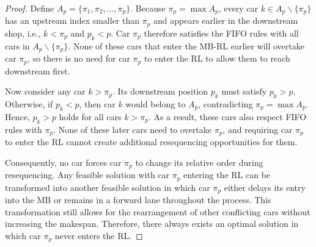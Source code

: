 \documentclass[10pt,a4paper]{amsart}
\begin{document}
\begin{proof}
    Define $A_p=\{\pi_1,\pi_2,\dots,\pi_p\}$. Because $\pi_p=\max A_p$, every car $k\in A_p\backslash\{\pi_p\}$ has an upstream index smaller than $\pi_p$ and appears earlier in the downstream shop, i.e., $k<\pi_p$ and $p_k<p$. Car $\pi_p$ therefore satisfies the FIFO rules with all cars in $A_p\backslash \{\pi_p\}$. None of these cars that enter the MB-RL earlier will overtake car $\pi_p$, so there is no need for car $\pi_p$ to enter the RL to allow them to reach downstream first.

    Now consider any car $k>\pi_p$. Its downstream position $p_k$ must satisfy $p_k>p$. Otherwise, if $p_k<p$, then car $k$ would belong to $A_p$, contradicting $\pi_p=\max A_p$. Hence, $p_k>p$ holds for all cars $k>\pi_p$. As a result, these cars also respect FIFO rules with $\pi_p$. None of these later cars need to overtake $\pi_p$, and requiring car $\pi_p$ to enter the RL cannot create additional resequencing opportunities for them.

    Consequently, no car forces car $\pi_p$ to change its relative order during resequencing. Any feasible solution with car $\pi_p$ entering the RL can be transformed into another feasible solution in which car $\pi_p$ either delays its entry into the MB or remains in a forward lane throughout the process. This transformation still allows for the rearrangement of other conflicting cars without increasing the makespan. Therefore, there always exists an optimal solution in which car $\pi_p$ never enters the RL.
\end{proof}
\end{document}

